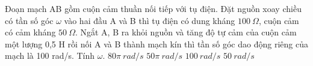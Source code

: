 \begin{vidu}%
Đoạn mạch AB gồm cuộn cảm thuần nối tiếp với tụ điện. Đặt nguồn xoay chiều có tần số góc $\omega $ vào hai đầu A và B thì tụ điện có dung kháng $100\ \Omega $, cuộn cảm có cảm kháng $50\ \Omega $. Ngắt A, B ra khỏi nguồn và tăng độ tự cảm của cuộn cảm một lượng 0,5 H rồi nối A và B thành mạch kín thì tần số góc dao động riêng của mạch là 100  rad/s. Tính $\omega $.
\choice
{$80\pi \ rad/s$}
{$50\pi \ rad/s$}
{\True $100\ rad/s$}
{$50\ rad/s$}
\end{vidu}
